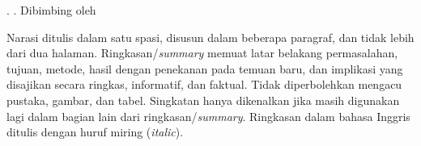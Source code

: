 \noindent
\MakeUppercase{\NamaPenulis}. \JudulTesis\unskip. Dibimbing oleh
\DaftarPembimbingKapital

Narasi ditulis dalam satu spasi, disusun dalam beberapa paragraf, dan tidak
lebih dari dua halaman. Ringkasan/\textit{summary} memuat latar belakang
permasalahan, tujuan, metode, hasil dengan penekanan pada temuan baru, dan
implikasi yang disajikan secara ringkas, informatif, dan faktual. Tidak
diperbolehkan mengacu pustaka, gambar, dan tabel. Singkatan hanya dikenalkan
jika masih digunakan lagi dalam bagian lain dari ringkasan/\textit{summary}.
Ringkasan dalam bahasa Inggris ditulis dengan huruf miring
(\textit{italic}).
